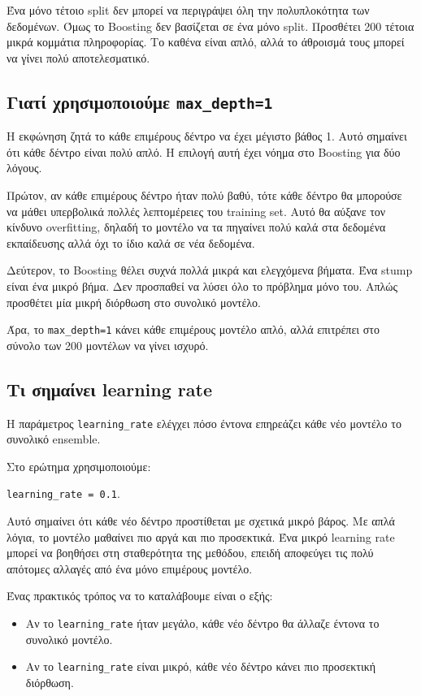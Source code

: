 \documentclass[12pt,a4paper]{article}
\newcommand{\code}[1]{\texttt{\textenglish{#1}}}
\begin{document}
Ένα μόνο τέτοιο split δεν μπορεί να περιγράψει όλη την πολυπλοκότητα των
δεδομένων. Όμως το Boosting δεν βασίζεται σε ένα μόνο split. Προσθέτει 200
τέτοια μικρά κομμάτια πληροφορίας. Το καθένα είναι απλό, αλλά το άθροισμά τους
μπορεί να γίνει πολύ αποτελεσματικό.

\subsection{Γιατί χρησιμοποιούμε \texorpdfstring{\code{max\_depth=1}}{max\_depth=1}}

Η εκφώνηση ζητά το κάθε επιμέρους δέντρο να έχει μέγιστο βάθος 1. Αυτό σημαίνει
ότι κάθε δέντρο είναι πολύ απλό. Η επιλογή αυτή έχει νόημα στο Boosting για δύο
λόγους.

Πρώτον, αν κάθε επιμέρους δέντρο ήταν πολύ βαθύ, τότε κάθε δέντρο θα μπορούσε
να μάθει υπερβολικά πολλές λεπτομέρειες του training set. Αυτό θα αύξανε τον
κίνδυνο overfitting, δηλαδή το μοντέλο να τα πηγαίνει πολύ καλά στα δεδομένα
εκπαίδευσης αλλά όχι το ίδιο καλά σε νέα δεδομένα.

Δεύτερον, το Boosting θέλει συχνά πολλά μικρά και ελεγχόμενα βήματα. Ένα stump
είναι ένα μικρό βήμα. Δεν προσπαθεί να λύσει όλο το πρόβλημα μόνο του. Απλώς
προσθέτει μία μικρή διόρθωση στο συνολικό μοντέλο.

Άρα, το \code{max\_depth=1} κάνει κάθε επιμέρους μοντέλο απλό, αλλά επιτρέπει
στο σύνολο των 200 μοντέλων να γίνει ισχυρό.

\subsection{Τι σημαίνει learning rate}

Η παράμετρος \code{learning\_rate} ελέγχει πόσο έντονα επηρεάζει κάθε νέο
μοντέλο το συνολικό ensemble.

Στο ερώτημα χρησιμοποιούμε:

\begin{center}
\code{learning\_rate = 0.1}.
\end{center}

Αυτό σημαίνει ότι κάθε νέο δέντρο προστίθεται με σχετικά μικρό βάρος. Με απλά
λόγια, το μοντέλο μαθαίνει πιο αργά και πιο προσεκτικά. Ένα μικρό learning
rate μπορεί να βοηθήσει στη σταθερότητα της μεθόδου, επειδή αποφεύγει τις πολύ
απότομες αλλαγές από ένα μόνο επιμέρους μοντέλο.

Ένας πρακτικός τρόπος να το καταλάβουμε είναι ο εξής:

\begin{itemize}
    \item Αν το \code{learning\_rate} ήταν μεγάλο, κάθε νέο δέντρο θα άλλαζε
    έντονα το συνολικό μοντέλο.
    \item Αν το \code{learning\_rate} είναι μικρό, κάθε νέο δέντρο κάνει πιο
    προσεκτική διόρθωση.
\end{itemize}
\end{document}
